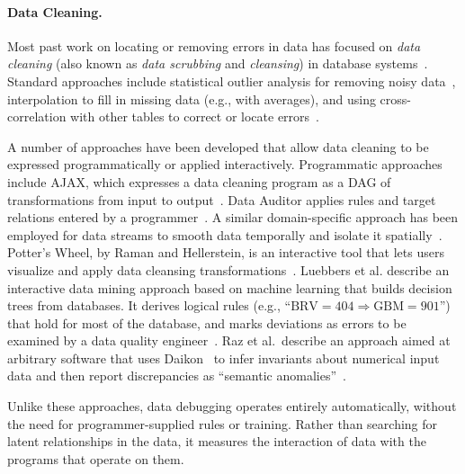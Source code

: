 
\paragraph{Data Cleaning.}
Most past work on locating or removing errors in data has focused
on \emph{data cleaning} (also known as \emph{data scrubbing}
and \emph{cleansing}) in database
systems~\cite{DBLP:journals/debu/RahmD00,han2006data}. Standard
approaches include statistical outlier analysis for removing noisy
data~\cite{1583581}, interpolation to fill in missing data (e.g., with
averages), and using cross-correlation with other tables to correct or
locate errors~\cite{Hernandez:1995:MPL:223784.223807}.




A number of approaches have been developed that allow data cleaning to
be expressed programmatically or applied interactively. Programmatic
approaches include AJAX, which expresses a data cleaning program as a
DAG of transformations from input to
output~\cite{Galhardas:2000:AED:342009.336568}. Data Auditor applies
rules and target relations entered by a
programmer~\cite{Golab:2010:DAE:1920841.1921060}. A similar
domain-specific approach has been employed for data streams to smooth
data temporally and isolate it spatially~\cite{1617508}. Potter's
Wheel, by Raman and Hellerstein, is an interactive tool that lets
users visualize and apply data cleansing
transformations~\cite{Raman:2001:PWI:645927.672045}.  Luebbers et
al. describe an interactive data mining approach based on machine
learning that builds decision trees from databases. It derives logical
rules (e.g., ``$\mbox{BRV} = 404 \Rightarrow \mbox{GBM} = 901$'') that
hold for most of the database, and marks deviations as errors to be
examined by a data quality
engineer~\cite{Luebbers:2003:SDD:1315451.1315499}. Raz et al.\
describe an approach aimed at arbitrary software that uses
Daikon~\cite{ernst2007daikon} to infer invariants about numerical input data and then
report discrepancies as ``semantic
anomalies''~\cite{Raz:2002:SAD:581339.581378}.

Unlike these approaches, data debugging operates entirely
automatically, without the need for programmer-supplied rules or training.  Rather
than searching for latent relationships in the data, it measures the
interaction of data with the programs that operate on them.
 

